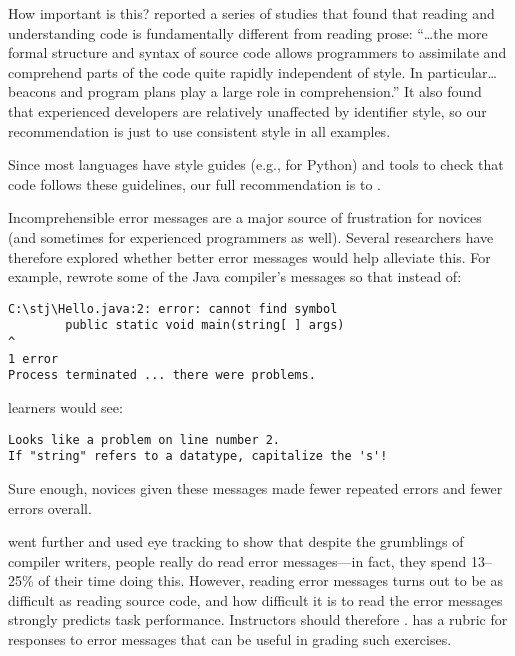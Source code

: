 How important is this? \cite{Bink2012} reported a series of studies that found that reading and understanding code is fundamentally different from reading prose: ``{\ldots}the more formal structure and syntax of source code allows programmers to assimilate and comprehend parts of the code quite rapidly independent of style. In particular{\ldots}beacons and program plans play a large role in comprehension.'' It also found that experienced developers are relatively unaffected by identifier style, so our recommendation is just to use consistent style in all examples.

Since most languages have style guides (e.g.,  for Python) and tools to check that code follows these guidelines, our full recommendation is to .


Incomprehensible error messages are a major source of frustration for novices (and sometimes for experienced programmers as well). Several researchers have therefore explored whether better error messages would help alleviate this. For example, \cite{Beck2016} rewrote some of the Java compiler's messages so that instead of:

\begin{verbatim}
C:\stj\Hello.java:2: error: cannot find symbol
        public static void main(string[ ] args)
^
1 error
Process terminated ... there were problems.
\end{verbatim}

\noindent
learners would see:

\begin{verbatim}
Looks like a problem on line number 2.
If "string" refers to a datatype, capitalize the 's'!
\end{verbatim}

Sure enough, novices given these messages made fewer repeated errors and fewer errors overall.

\cite{Bari2017} went further and used eye tracking to show that despite the grumblings of compiler writers, people really do read error messages---in fact, they spend 13--25\% of their time doing this. However, reading error messages turns out to be as difficult as reading source code, and how difficult it is to read the error messages strongly predicts task performance. Instructors should therefore . \cite{Marc2011} has a rubric for responses to error messages that can be useful in grading such exercises.

